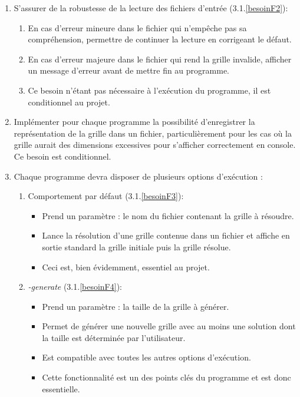 \documentclass[12pt]{article}
\begin{document}
\begin{enumerate}
\item S'assurer de la robustesse de la lecture des fichiers d'entrée (3.1.\ref{besoinF2}):
\begin{enumerate}
\item En cas d'erreur mineure dans le fichier qui n'empêche pas sa compréhension, permettre de continuer la lecture en corrigeant le défaut.
\item En cas d'erreur majeure dans le fichier qui rend la grille invalide, afficher un message d'erreur avant de mettre fin au programme.
\item Ce besoin n'étant pas nécessaire à l'exécution du programme, il est conditionnel au projet.
\end{enumerate}

\item Implémenter pour chaque programme la possibilité d'enregistrer la représentation de la grille dans un fichier, particulièrement pour les cas où la grille aurait des dimensions excessives pour s'afficher correctement en console. Ce besoin est conditionnel.
\item  Chaque programme devra disposer de plusieurs options d'exécution :
\begin{enumerate}

\item Comportement par défaut (3.1.\ref{besoinF3}):
\begin{itemize}
\item Prend un paramètre : le nom du fichier contenant la grille à résoudre.
\item Lance la résolution d'une grille contenue dans un fichier et affiche en sortie standard la grille initiale puis la grille résolue.
\item Ceci est, bien évidemment, essentiel au projet.\\
\end{itemize}

\item \textit{-generate} (3.1.\ref{besoinF4}):
\begin{itemize}
\item Prend un paramètre : la taille de la grille à générer.
\item Permet de générer une nouvelle grille avec au moins une solution dont la taille est déterminée par l'utilisateur.
\item Est compatible avec toutes les autres options d'exécution.
\item Cette fonctionnalité est un des points clés du programme et est donc essentielle.\\
\end{itemize}


\end{enumerate}
\end{enumerate}
\end{document}
